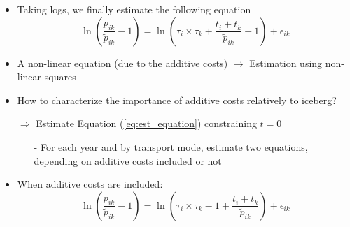 \documentclass[10 pt,Helvetica, french]{beamer}
\begin{document}
\begin{frame} [label=slide_method]
\begin{itemize}
\item Taking logs, we finally estimate the following equation
\footnotesize
\begin{equation}
\ln\left(\frac{p_{ik}}{\widetilde{p}_{ik}}-1 \right)= \ln \left(\tau_{i} \times \tau_{k}+\frac{t_{i} + t_{k}}{\widetilde{p}_{ik}}-1 \right) + \epsilon_{ik} \label{eq:est_equation}
\end{equation}
\normalsize
\item A non-linear equation (due to the additive costs) $\rightarrow$ Estimation using non-linear squares \hyperlink{app_method}{} \vspace{0.1cm}
\item How to characterize the importance of additive costs relatively to iceberg? \vspace{0.1cm}
\item[$\Rightarrow$] Estimate Equation (\ref{eq:est_equation}) constraining $t=0$ \vspace{0.1cm}
\begin{itemize}
\item[-] For each year and by transport mode, estimate two equations, depending on additive costs included or not \vspace{0.1cm}
\end{itemize}
\item When additive costs are included:
\footnotesize
\begin{equation}
\ln\left(\frac{p_{ik}}{\widetilde{p}_{ik}}-1 \right)= \ln \left(\tau_{i} \times \tau_{k}-1 +\frac{t_{i} + t_{k}}{\widetilde{p}_{ik}}\right) + \epsilon_{ik} \label{eq:model_with_add}
\end{equation}

\end{itemize}
\end{frame}
\end{document}
